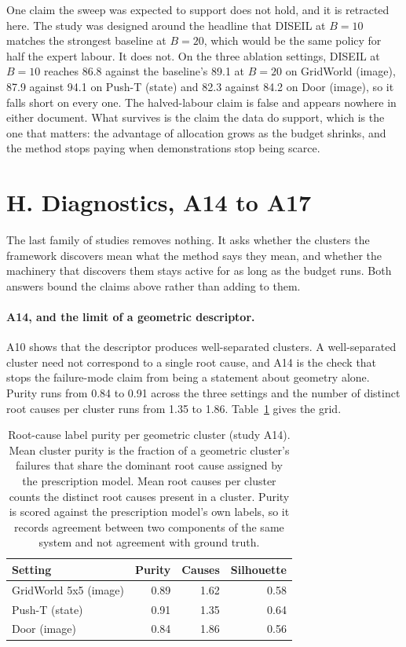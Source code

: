 \documentclass[letterpaper]{article}
\begin{document}
One claim the sweep was expected to support does not hold, and it is retracted here. The
study was designed around the headline that DISEIL at $B = 10$ matches the strongest
baseline at $B = 20$, which would be the same policy for half the expert labour. It does
not. On the three ablation settings, DISEIL at $B = 10$ reaches 86.8 against the
baseline's 89.1 at $B = 20$ on GridWorld (image), 87.9 against 94.1 on Push-T (state)
and 82.3 against 84.2 on Door (image), so it falls short on every one. The halved-labour
claim is false and appears nowhere in either document. What survives is the claim the
data do support, which is the one that matters: the advantage of allocation grows as the
budget shrinks, and the method stops paying when demonstrations stop being scarce.

\section{H. Diagnostics, A14 to A17}

The last family of studies removes nothing. It asks whether the clusters the framework
discovers mean what the method says they mean, and whether the machinery that discovers
them stays active for as long as the budget runs. Both answers bound the claims above
rather than adding to them.

\paragraph{A14, and the limit of a geometric descriptor.} A10 shows that the descriptor
produces well-separated clusters. A well-separated cluster need not correspond to a
single root cause, and A14 is the check that stops the failure-mode claim from being a
statement about geometry alone. Purity runs from 0.84 to 0.91 across the three settings
and the number of distinct root causes per cluster runs from 1.35 to 1.86.
Table~\ref{tab:purity} gives the grid.

\begin{table}[t]
\centering
\caption{Root-cause label purity per geometric cluster (study A14). Mean cluster purity
is the fraction of a geometric cluster's failures that share the dominant root cause
assigned by the prescription model. Mean root causes per cluster counts the distinct root
causes present in a cluster. Purity is scored against the prescription model's own labels,
so it records agreement between two components of the same system and not agreement
with ground truth.}
\label{tab:purity}
\begin{tabular}{lrrr}
\toprule
Setting & Purity & Causes & Silhouette \\
\midrule
GridWorld 5x5 (image) & 0.89 & 1.62 & 0.58 \\
Push-T (state) & 0.91 & 1.35 & 0.64 \\
Door (image) & 0.84 & 1.86 & 0.56 \\
\bottomrule
\end{tabular}
\end{table}
\end{document}
